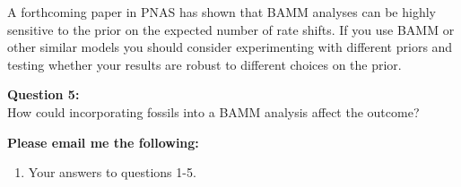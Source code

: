 \documentclass[11pt]{article}
\begin{document}
A forthcoming paper in PNAS has
shown that BAMM analyses can be
highly sensitive to the prior on the 
expected number of rate shifts.
If you use BAMM or other similar models you should
consider experimenting with different priors
and testing whether your results
are robust to different choices on the prior.

\begin{framed}
\noindent
\textbf{Question 5:} \\
How could incorporating fossils into a BAMM analysis
affect the outcome?
\end{framed}

\begin{framed}
\noindent
\textbf{Please email me the following:}
\begin{enumerate}
  \item Your answers to questions 1-5.
\end{enumerate}
\end{framed}


 
\end{document}
